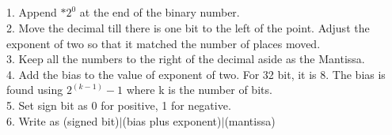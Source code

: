 \documentclass{article}
\begin{document}
	\subsection{}
		1. Append $* 2^0$ at the end of the binary number.
		\\
		2. Move the decimal till there is one bit to the left of the point. Adjust the exponent of two so that it matched the number of places moved.
		\\
		3. Keep all the numbers to the right of the decimal aside as the Mantissa.
		\\
		4. Add the bias to the value of exponent of two. For 32 bit, it is 8. The bias is found using $2^(k-1) -1$ where k is the number of bits.
		\\
		5. Set sign bit as 0 for positive, 1 for negative.
		\\
		6. Write as (signed bit)$|$(bias plus exponent)$|$(mantissa)
		
			
			
\end{document}
